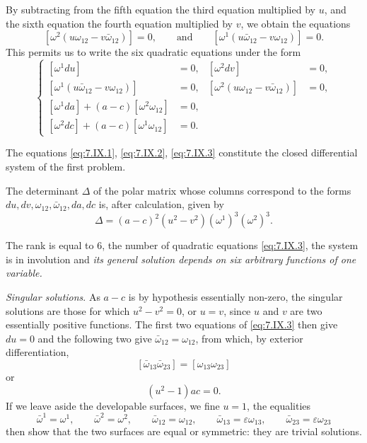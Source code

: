 \documentclass[leqno,11pt]{book}
\numberwithin{equation}{chapter}
\theoremstyle{shape1}
\theoremstyle{shape0}
\theoremstyle{shape2}
\theoremstyle{definition}
\begin{document}
By subtracting from the fifth equation the third equation multiplied by $u$, and the sixth equation the fourth equation multiplied by $v$, we obtain the equations
\[
[\omega^{2}(u\omega_{12}-v\bar\omega_{12})]=0,\qquad\text{and}\qquad [\omega^{1}(u\bar\omega_{12}-v\omega_{12})]=0.
\]
This permits us to write the six quadratic equations under the form
\begin{equation}
  \label{eq:7.IX.3}\tag{IX, 3}
  \left\{
  \begin{aligned}{}
    [\omega^{1}du]&=0,&[\omega^{2}dv]&=0,\\
    [\omega^{1}(u\bar\omega_{12}-v\omega_{12})]&=0,&[\omega^{2}(u\omega_{12}-v\bar\omega_{12})]&=0,\\
    [\omega^{1}da]+(a-c)[\omega^{2}\omega_{12}]&=0,\\
    [\omega^{2}dc]+(a-c)[\omega^{1}\omega_{12}]&=0.
  \end{aligned}
  \right.
\end{equation}

The equations \eqref{eq:7.IX.1}, \eqref{eq:7.IX.2}, \eqref{eq:7.IX.3} constitute the closed differential system of the first problem.

The determinant $\Delta$ of the polar matrix whose columns correspond to the forms $du,dv,\omega_{12},\bar\omega_{12},da,dc$ is, after calculation, given by
\begin{equation}
  \label{eq:7.IX.4}\tag{IX, 4}
  \Delta=(a-c)^{2}(u^{2}-v^{2})(\omega^{1})^{3}(\omega^{2})^{3}.
\end{equation}

The rank is equal to $6$, the number of quadratic equations \eqref{eq:7.IX.3}, the system is in involution and \emph{its general solution depends on six arbitrary functions of one variable.}

\emph{Singular solutions}. As $a-c$ is by hypothesis essentially non-zero, the singular solutions are those for which $u^{2}-v^{2}=0$, or $u=v$, since $u$ and $v$ are two essentially positive functions. The first two equations of \eqref{eq:7.IX.3} then give $du=0$ and the following two give $\bar\omega_{12}=\omega_{12}$, from which, by exterior differentiation, 
\[
[\bar\omega_{13}\bar\omega_{23}]=[\omega_{13}\omega_{23}]
\]
or
\[
(u^{2}-1)ac=0.
\]
If we leave aside the developable surfaces, we fine $u=1$, the equalities
\[
\bar\omega^{1}=\omega^{1},\qquad\bar\omega^{2}=\omega^{2},\qquad\bar\omega_{12}=\omega_{12},\qquad\bar\omega_{13}=\varepsilon\omega_{13},\qquad\bar\omega_{23}=\varepsilon\omega_{23}
\]
then show that the two surfaces are equal or symmetric: they are trivial solutions.
\end{document}
